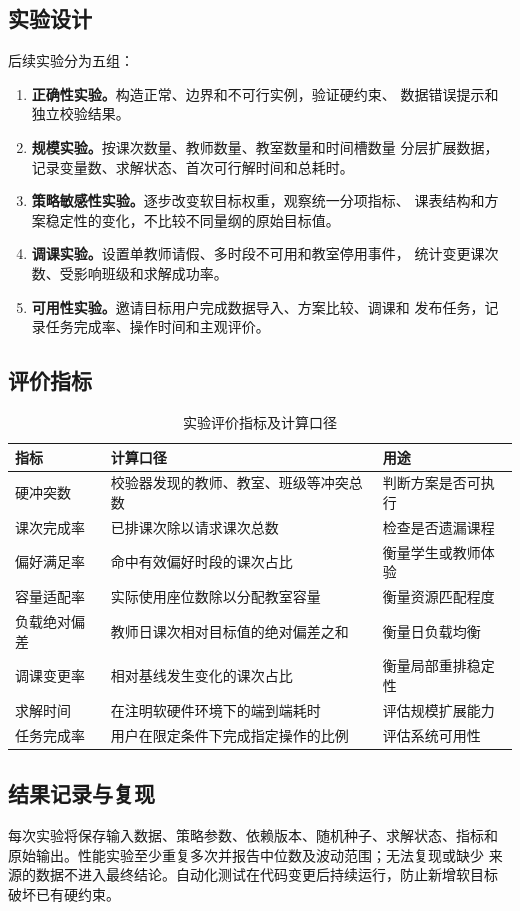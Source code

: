 \subsection{实验设计}

后续实验分为五组：

\begin{enumerate}
  \item \textbf{正确性实验。}构造正常、边界和不可行实例，验证硬约束、
  数据错误提示和独立校验结果。
  \item \textbf{规模实验。}按课次数量、教师数量、教室数量和时间槽数量
  分层扩展数据，记录变量数、求解状态、首次可行解时间和总耗时。
  \item \textbf{策略敏感性实验。}逐步改变软目标权重，观察统一分项指标、
  课表结构和方案稳定性的变化，不比较不同量纲的原始目标值。
  \item \textbf{调课实验。}设置单教师请假、多时段不可用和教室停用事件，
  统计变更课次数、受影响班级和求解成功率。
  \item \textbf{可用性实验。}邀请目标用户完成数据导入、方案比较、调课和
  发布任务，记录任务完成率、操作时间和主观评价。
\end{enumerate}

\subsection{评价指标}

\begin{table}[htbp]
  \centering
  \caption{实验评价指标及计算口径}
  \label{tab:evaluation-metrics}
  \small
  \begin{tabularx}{\textwidth}{L{3.0cm} L{3.6cm} Y}
    \toprule
    \textbf{指标} & \textbf{计算口径} & \textbf{用途} \\
    \midrule
    硬冲突数 & 校验器发现的教师、教室、班级等冲突总数 & 判断方案是否可执行 \\
    课次完成率 & 已排课次除以请求课次总数 & 检查是否遗漏课程 \\
    偏好满足率 & 命中有效偏好时段的课次占比 & 衡量学生或教师体验 \\
    容量适配率 & 实际使用座位数除以分配教室容量 & 衡量资源匹配程度 \\
    负载绝对偏差 & 教师日课次相对目标值的绝对偏差之和 & 衡量日负载均衡 \\
    调课变更率 & 相对基线发生变化的课次占比 & 衡量局部重排稳定性 \\
    求解时间 & 在注明软硬件环境下的端到端耗时 & 评估规模扩展能力 \\
    任务完成率 & 用户在限定条件下完成指定操作的比例 & 评估系统可用性 \\
    \bottomrule
  \end{tabularx}
\end{table}

\subsection{结果记录与复现}

每次实验将保存输入数据、策略参数、依赖版本、随机种子、求解状态、指标和
原始输出。性能实验至少重复多次并报告中位数及波动范围；无法复现或缺少
来源的数据不进入最终结论。自动化测试在代码变更后持续运行，防止新增软目标
破坏已有硬约束。
